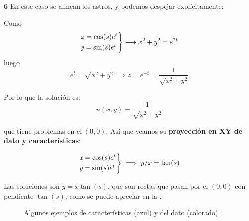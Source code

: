 \begin{example}{\bf 6}
		En este caso se alinean los astros, y podemos despejar explícitamente:

		Como
		\[
		\begin{rcases}
			x = \cos (s) e^t\\
			y = \sin (s) e^t
		\end{rcases}
		 \longrightarrow x^2 + y^2 = e^{2t} \]
		luego
		\[e^t = \sqrt{x^2 + y^2} \implies z = e^{-t} = \frac{1}{\sqrt{x^2 + y^2}} \]

		Por lo que la solución es:
		\[ u(x,y) = \frac{1}{\sqrt{x^2+y^2}}\]

		que tiene problemas en el $(0,0)$. Así que veamos su {\bf proyección en XY de dato y características}:

		\[
		\begin{rcases}
			x = \cos (s) e^t\\
			y = \sin (s) e^t
		\end{rcases}
		\implies y/x = \tan(s) \]

		Las soluciones son ${y = x \tan(s)}$, que son rectas que pasan por el $(0,0)$ con pendiente $\tan(s)$, como se puede apreciar en la .

		\begin{figure}[hbtp]
			\caption{Algunos ejemplos de características (azul) y del dato (colorado).}
			\label{fig:Proy-XY-ejemplo-6}
		\end{figure}

	\end{example}

